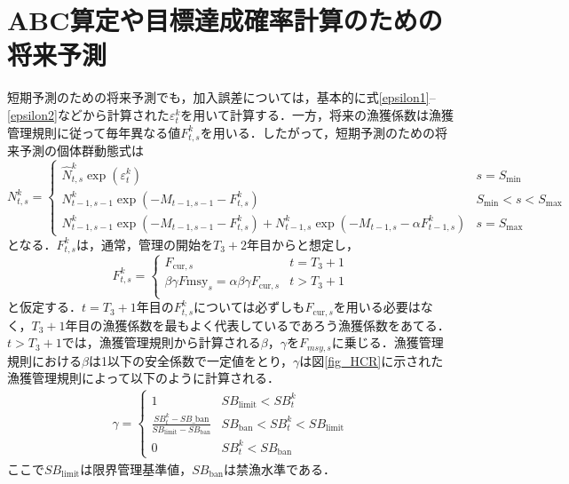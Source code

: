 \documentclass[11pt]{jsarticle}
\begin{document}
\section{ABC算定や目標達成確率計算のための将来予測}
短期予測のための将来予測でも，加入誤差については，基本的に式\ref{epsilon1}--\ref{epsilon2}などから計算された$\varepsilon_t^k$を用いて計算する．一方，将来の漁獲係数は漁獲管理規則に従って毎年異なる値$F_{t,s}^k$を用いる．したがって，短期予測のための将来予測の個体群動態式は
\begin{equation}
  N_{t,s}^k = \begin{cases}
      \hat{N}_{t, s}^k \exp (\varepsilon_t^k) &     s = S_\mathrm{min} \\    
      N_{t-1, s-1}^k  \exp(-M_{t-1,s-1}- F_{t,s}^k )  &    S_\mathrm{min} < s < S_\mathrm{max} \\
      N_{t-1, s-1}^k  \exp(-M_{t-1,s-1}- F_{t,s}^k ) + N_{t-1, s}^k  \exp(-M_{t-1,s} - \alpha F_{t-1,s}^k) &   s=S_{\mathrm{max}}
  \end{cases}
  \label{future_eq3}
\end{equation}
となる．$F_{t,s}^k$は，通常，管理の開始を$T_{3}+2$年目からと想定し，
\begin{equation}
  F_{t,s}^k = \begin{cases}
   F_{\mathrm{cur},s} &     t = T_3+1 \\    
   \beta \gamma  F\mathrm{msy}_s = \alpha \beta \gamma F_{\mathrm{cur},s}
   &     t > T_3+1 \\
  \end{cases}
  \label{future_eq3}
\end{equation}
と仮定する．$t=T_3+1$年目の$F_{t,s}^k$については必ずしも$F_{\mathrm{cur},s}$を用いる必要はなく，$T_3+1$年目の漁獲係数を最もよく代表しているであろう漁獲係数をあてる．$t>T_3+1$では，漁獲管理規則から計算される$\beta$，$\gamma$を$F_{msy,s}$に乗じる．漁獲管理規則における$\beta$は1以下の安全係数で一定値をとり，$\gamma$は図\ref{fig_HCR}に示された漁獲管理規則によって以下のように計算される．
\begin{eqnarray}
  \gamma =
  \begin{cases}
    1   &  S\!B_{\mathrm{limit}} < S\!B_t^k \\
    \frac{S\!B_t^k-S\!B\_{\mathrm{ban}}}{S\!B_{\mathrm{limit}} -S\!B_{\mathrm{ban}}}  & S\!B_{\mathrm{ban}} < S\!B_t^k< S\!B_{\mathrm{limit}} \\
    0    &   S\!B_t^k < S\!B_{\mathrm{ban}}
  \end{cases}
\end{eqnarray}
ここで$S\!B_{\mathrm{limit}}$は限界管理基準値，$S\!B_{\mathrm{ban}}$は禁漁水準である．
\end{document}
